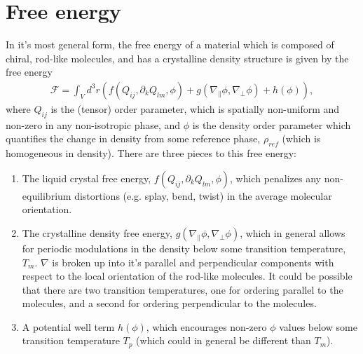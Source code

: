 \documentclass[12pt]{article}
\begin{document}


\section{Free energy}
In it's most general form, the free energy of a material which is composed of chiral, rod-like molecules, and has a crystalline density structure is given by the free energy
\begin{align}\label{eq:Fgeneral}
\mathcal{F} = \int_{V}d^3r\left(f(Q_{ij},\partial_kQ_{lm},\phi)+g(\nabla_{\parallel}\phi,\nabla_{\bot}\phi)+h(\phi)\right),
\end{align}
where $Q_{ij}$ is the (tensor) order parameter, which is spatially non-uniform and non-zero in any non-isotropic phase, and $\phi$ is the density order parameter which quantifies the change in density from some reference phase, $\rho_{ref}$ (which is homogeneous in density). There are three pieces to this free energy:
\begin{enumerate}[label={\roman*}]
	\item The liquid crystal free energy, $f(Q_{ij},\partial_kQ_{lm},\phi)$, which penalizes any non-equilibrium distortions (e.g. splay, bend, twist) in the average molecular orientation.
	\item The crystalline density free energy, $g(\nabla_{\parallel}\phi,\nabla_{\bot}\phi)$, which in general allows for periodic modulations in the density below some transition temperature, $T_m$. $\nabla$ is broken up into it's parallel and perpendicular components with respect to the local orientation of the rod-like molecules. It could be possible that there are two transition temperatures, one for ordering parallel to the molecules, and a second for ordering perpendicular to the molecules.
	\item A potential well term $h(\phi)$, which encourages non-zero $\phi$ values below some transition temperature $T_p$ (which could in general be different than $T_m$).
\end{enumerate}
\end{document}
